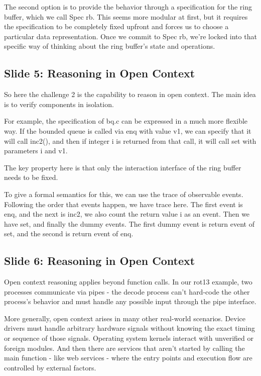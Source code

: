 \documentclass{article}
\begin{document}
The second option is to provide the behavior through a specification for the
ring buffer, which we call Spec rb. This seems more modular at first, but it
requires the specification to be completely fixed upfront and forces us to
choose a particular data representation. Once we commit to Spec rb, we're locked
into that specific way of thinking about the ring buffer's state and operations.

\subsection{Slide 5: Reasoning in Open Context}

So here the challenge 2 is the capability to reason in open context. The main
idea is to verify components in isolation.

For example, the specification of bq.c can be expressed in a much more flexible
way. If the bounded queue is called via enq with value v1, we can specify that
it will call inc2(), and then if integer i is returned from that call, it will
call set with parameters i and v1.

The key property here is that only the interaction interface of the ring buffer
needs to be fixed.

To give a formal semantics for this, we can use the trace of observable events.
Following the order that events happen, we have trace here. The first event is
enq, and the next is inc2, we also count the return value i as an event. Then we
have set, and finally the dummy events. The first dummy event is return event of
set, and the second is return event of enq.

\subsection{Slide 6: Reasoning in Open Context}

Open context reasoning applies beyond function calls. In our rot13 example, two
processes communicate via pipes - the decode process can't hard-code the other
process's behavior and must handle any possible input through the pipe
interface.

More generally, open context arises in many other real-world scenarios. Device
drivers must handle arbitrary hardware signals without knowing the exact timing
or sequence of those signals. Operating system kernels interact with unverified
or foreign modules. And then there are services that aren't started by calling
the main function - like web services - where the entry points and execution
flow are controlled by external factors.
\end{document}

